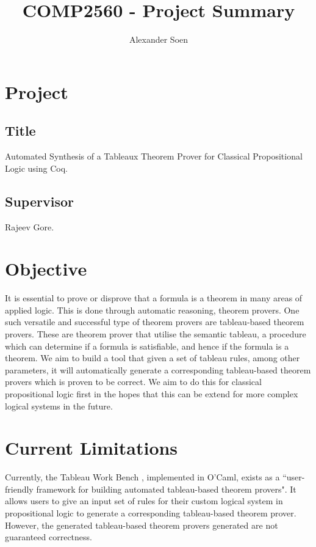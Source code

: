 \documentclass[onecolumn]{report}
\title{COMP2560 - Project Summary}
\author{Alexander Soen}
\begin{document}
\maketitle

\section*{Project}

\subsection*{Title}

Automated Synthesis of a Tableaux Theorem Prover for Classical Propositional
Logic using Coq.

\subsection*{Supervisor}

Rajeev Gore.

\section*{Objective}

It is essential to prove or disprove that a formula is a theorem in many areas
of applied logic. This is done through automatic reasoning, theorem provers.
One such versatile and successful type of theorem provers are tableau-based
theorem provers. These are theorem prover that utilise the semantic tableau, a
procedure which can determine if a formula is satisfiable, and hence if the
formula is a theorem. We aim to build a tool that given a set of tableau rules,
among other parameters, it will automatically generate a corresponding
tableau-based theorem provers which is proven to be correct. We aim to do this
for classical propositional logic first in the hopes that this can be extend
for more complex logical systems in the future.

\section*{Current Limitations}

Currently, the Tableau Work Bench \cite{twb}, implemented in O'Caml, exists as
a ``user-friendly framework for building automated tableau-based theorem
provers". It allows users to give an input set of rules for their custom
logical system in propositional logic to generate a corresponding tableau-based
theorem prover. However, the generated tableau-based theorem provers generated
are not guaranteed correctness.
\end{document}
